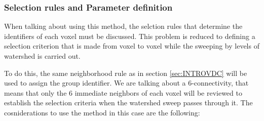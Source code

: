 \documentclass[a4paper,fleqn,usenatbib]{mnras}
\begin{document}
\subsubsection{Selection rules and Parameter definition}
When talking about using this method, the selction rules that determine the identifiers of each voxel must be discussed. This problem is reduced to defining a selection criterion that is made from voxel to voxel while the sweeping by levels of watershed is carried out. 

To do this, the same neighborhood rule as in section \ref{sec:INTROVDC} will be used to assign the group identifier. We are talking about  a 6-connectivity, that means that only the 6 immediate neighbors of each voxel will be reviewed to establish the selection criteria when the watershed sweep passes through it. The cosniderations to use the method in this case are the following:
\end{document}
